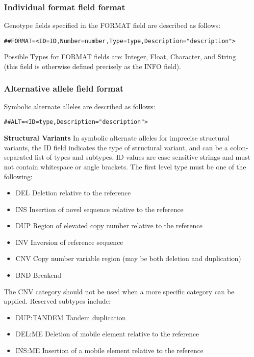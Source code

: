 \documentclass[8pt]{article}
\begin{document}
\subsubsection{Individual format field format}
Genotype fields specified in the FORMAT field are described as follows:

\begin{verbatim}
##FORMAT=<ID=ID,Number=number,Type=type,Description="description">
\end{verbatim}

Possible Types for FORMAT fields are: Integer, Float, Character, and String (this field is otherwise defined precisely as the INFO field).

\subsubsection{Alternative allele field format}
Symbolic alternate alleles are described as follows:
\begin{verbatim}
##ALT=<ID=type,Description="description">
\end{verbatim}

\noindent \textbf{Structural Variants} \newline
In symbolic alternate alleles for imprecise structural variants, the ID field indicates the type of structural variant, and can be a colon-separated list of types and subtypes.
ID values are case sensitive strings and must not contain whitespace or angle brackets.
The first level type must be one of the following:
\begin{itemize}
  \item DEL Deletion relative to the reference
  \item INS Insertion of novel sequence relative to the reference
  \item DUP Region of elevated copy number relative to the reference
  \item INV Inversion of reference sequence
  \item CNV Copy number variable region (may be both deletion and duplication)
  \item BND Breakend
\end{itemize}

The CNV category should not be used when a more specific category can be applied. Reserved subtypes include:
\begin{itemize}
  \item DUP:TANDEM Tandem duplication
  \item DEL:ME Deletion of mobile element relative to the reference
  \item INS:ME Insertion of a mobile element relative to the reference
\end{itemize}
\end{document}
